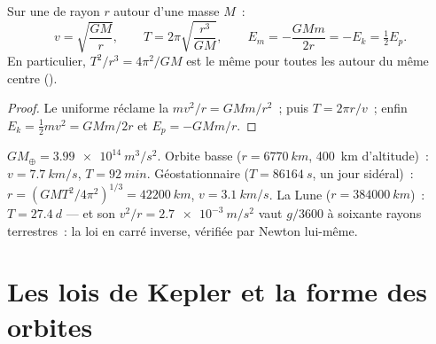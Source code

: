 \begin{theorem}\label{thm:b1:central-forces:circular}
Sur une  de rayon $r$ autour d'une masse $M$~:
\[
v = \sqrt{\frac{GM}{r}}, \qquad
T = 2\pi\sqrt{\frac{r^3}{GM}}, \qquad
E_m = -\frac{GMm}{2r} = -E_k = \tfrac12 E_p .
\]
En particulier, $T^2/r^3 = 4\pi^2/GM$ est le même pour toutes les  autour du même centre ().
\end{theorem}

\begin{proof}
Le  uniforme réclame la 
$mv^2/r = GMm/r^2$~; puis $T = 2\pi r/v$~; enfin
$E_k = \tfrac12 mv^2 = GMm/2r$ et $E_p = -GMm/r$.
\end{proof}

\begin{example}\label{ex:b1:central-forces:orbits}
$GM_\oplus = \qty{3.99e14}{m^3/s^2}$. Orbite basse ($r = \qty{6770}{km}$,
\qty{400}{km} d'altitude)~: $v = \qty{7.7}{km/s}$, $T = \qty{92}{min}$.
Géostationnaire ($T = \qty{86164}{s}$, un jour sidéral)~: $r = (GMT^2/4\pi^2)^{1/3} =
\qty{42200}{km}$, $v = \qty{3.1}{km/s}$. La Lune ($r = \qty{384000}{km}$)~:
$T = \qty{27.4}{d}$ --- et son  $v^2/r =
\qty{2.7e-3}{m/s^2}$ vaut $g/3600$ à soixante rayons terrestres~: la loi
en carré inverse, vérifiée par Newton lui-même.
\end{example}

\section{Les lois de Kepler et la forme des orbites}

